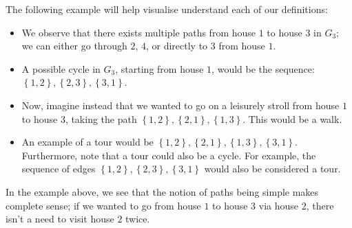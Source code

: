 \documentclass[openany]{book}
\begin{document}
\begin{example}
	The following example will help visualise understand each of our definitions:
	\begin{center}
	\end{center}

	\begin{itemize}
		\item We observe that there exists multiple paths from house $1$ to house $3$ in $G_{3}$; we can either go through $2$, $4$, or directly to $3$ from house $1$.
	
		\item A possible cycle in $G_{3}$, starting from house $1$, would be the sequence: $\left\{  1, 2\right\}, \left\{  2, 3\right\}, \left\{  3, 1\right\}$.
	
		\item Now, imagine instead that we wanted to go on a leisurely stroll from house $1$ to house $3$, taking the path $\left\{  1,2\right\}, \left\{  2,1\right\}, \left\{  1, 3\right\}$. This would be a walk.
	
		\item An example of a tour would be $\left\{  1,2\right\}, \left\{  2,1\right\}, \left\{  1, 3\right\}, \left\{  3, 1\right\}$. Furthermore, note that a tour could also be a cycle. For example, the sequence of edges $\left\{  1,2\right\}, \left\{  2,3\right\}, \left\{  3,1\right\}$ would also be considered a tour.
	\end{itemize}
\end{example}
\begin{rmk}
	In the example above, we see that the notion of paths being simple makes complete sense; if we wanted to go from house $1$ to house $3$ via house $2$, there isn't a need to visit house $2$ twice.
\end{rmk}
\end{document}
